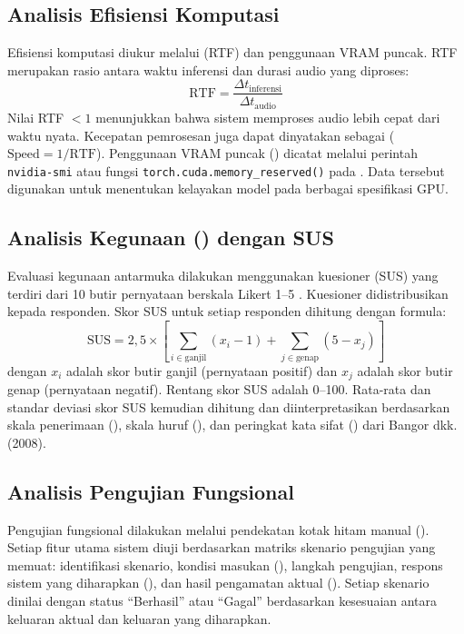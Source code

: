 \subsection{Analisis Efisiensi Komputasi}
Efisiensi komputasi diukur melalui  (RTF) dan penggunaan VRAM puncak. RTF merupakan rasio antara waktu inferensi dan durasi audio yang diproses:
    \begin{equation}
        \text{RTF} = \frac{\Delta t_{\text{inferensi}}}{\Delta t_{\text{audio}}}
    \end{equation}
    Nilai RTF $< 1$ menunjukkan bahwa sistem memproses audio lebih cepat dari waktu nyata. Kecepatan pemrosesan juga dapat dinyatakan sebagai  ($\text{Speed} = 1/\text{RTF}$).
Penggunaan VRAM puncak () dicatat melalui  perintah \texttt{nvidia-smi} atau fungsi \texttt{torch.cuda.memory\_reserved()} pada . Data tersebut digunakan untuk menentukan kelayakan model pada berbagai spesifikasi GPU.

\subsection{Analisis Kegunaan () dengan SUS}
Evaluasi kegunaan antarmuka dilakukan menggunakan kuesioner  (SUS) yang terdiri dari 10 butir pernyataan berskala Likert 1--5 \citep{brooke_sus_1986}. Kuesioner didistribusikan kepada \jumlahresponden{} responden. Skor SUS untuk setiap responden dihitung dengan formula:
\begin{equation}
    \text{SUS} = 2{,}5 \times \left[\sum_{i \in \text{ganjil}} (x_i - 1) + \sum_{j \in \text{genap}} (5 - x_j)\right]
\end{equation}
dengan $x_i$ adalah skor butir ganjil (pernyataan positif) dan $x_j$ adalah skor butir genap (pernyataan negatif). Rentang skor SUS adalah 0--100. Rata-rata dan standar deviasi skor SUS kemudian dihitung dan diinterpretasikan berdasarkan skala penerimaan (), skala huruf (), dan peringkat kata sifat () dari Bangor dkk. (2008).

\subsection{Analisis Pengujian Fungsional}
Pengujian fungsional dilakukan melalui pendekatan kotak hitam manual (). Setiap fitur utama sistem diuji berdasarkan matriks skenario pengujian yang memuat: identifikasi skenario, kondisi masukan (), langkah pengujian, respons sistem yang diharapkan (), dan hasil pengamatan aktual (). Setiap skenario dinilai dengan status ``Berhasil'' atau ``Gagal'' berdasarkan kesesuaian antara keluaran aktual dan keluaran yang diharapkan.

